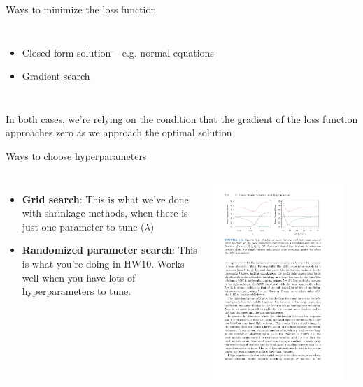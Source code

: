 \documentclass[mathserif, aspectratio=169]{beamer}
\begin{document}
\begin{frame}{Ways to minimize the loss function}
	\begin{columns}
			\begin{itemize}
				\item Closed form solution -- e.g. normal equations
				\item Gradient search
			\end{itemize}

	\end{columns}

	In both cases, we're relying on the condition that the gradient of the loss function approaches zero as we approach the optimal solution 
\end{frame}


\begin{frame}{Ways to choose hyperparameters}
	\begin{columns}
		\column{0.5\textwidth}
			\begin{itemize}
				\item \textbf{Grid search}: This is what we've done with shrinkage methods, when there is just one parameter to tune ($\lambda$)
				\item \textbf{Randomized parameter search}: This is what you're doing in HW10.  Works well when you have lots of hyperparameters to tune.
			\end{itemize}
		\column{0.5\textwidth}
			\includegraphics[width=0.9\textwidth]{bias-variance-ridge}

\end{columns}
\end{frame}
\end{document}
